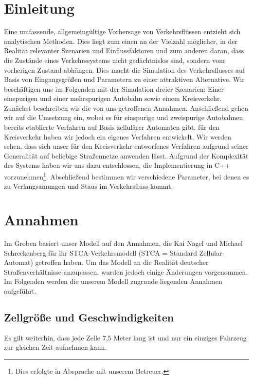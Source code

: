 \documentclass[10pt, a4paper]{article}
\begin{document}
\newpage
\section{Einleitung}
\label{sec:einleitung}
Eine umfassende, allgemeingültige Vorhersage von Verkehrsflüssen entzieht sich analytischen Methoden. Dies liegt zum einen an der Vielzahl möglicher, in der Realität relevanter Szenarien und Einflussfaktoren und zum anderen daran, dass die Zustände eines Verkehrssystems nicht gedächtnislos sind, sondern vom vorherigen Zustand abhängen. Dies macht die Simulation des Verkehrsflusses auf Basis von Eingangsgrößen und Parametern zu einer attraktiven Alternative. Wir beschäftigen uns im Folgenden mit der Simulation dreier Szenarien: Einer einspurigen und einer mehrspurigen Autobahn sowie einem Kreisverkehr. Zunächst beschreiben wir die von uns getroffenen Annahmen. Anschließend gehen wir auf die Umsetzung ein, wobei es für einspurige und zweispurige Autobahnen bereits etablierte Verfahren auf Basis zellulärer Automaten gibt, für den Kreisverkehr haben wir jedoch ein eigenes Verfahren entwickelt. Wir werden sehen, dass sich unser für den Kreisverkehr entworfenes Verfahren aufgrund seiner Generalität auf beliebige Straßennetze anwenden lässt. Aufgrund der Komplexität des Systems haben wir uns dazu entschlossen, die Implementierung in C++ vorzunehmen\footnote{Dies erfolgte in Absprache mit unserem Betreuer.}. Abschließend bestimmen wir verschiedene Parameter, bei denen es zu Verlangsamungen und Staus im Verkehrsfluss kommt.

\section{Annahmen}
\label{sec:annahmen}

Im Groben basiert unser Modell auf den Annahmen, die Kai Nagel und Michael Schreckenberg \cite{nagel-schreckenberg} für ihr STCA-Verkehrsmodell (STCA = Standard Zellular-Automat) getroffen haben. Um das Modell an die Realität deutscher Straßenverhältnisse anzupassen, wurden jedoch einige Änderungen vorgenommen.
Im Folgenden werden die unserem Modell zugrunde liegenden Annahmen aufgeführt.

\subsection{Zellgröße und Geschwindigkeiten}

Es gilt weiterhin, dass jede Zelle 7,5 Meter lang ist und nur ein einziges Fahrzeug zur gleichen Zeit aufnehmen kann.
\end{document}
